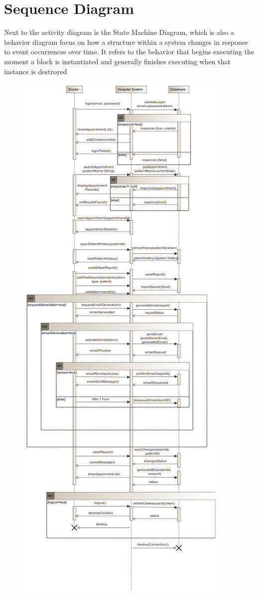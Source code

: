 \documentclass{article}
\begin{document}
            \section{Sequence Diagram}
            Next to the activity diagram is the State Machine Diagram, which is also a behavior
            diagram focus on how a structure within a system changes in response to event
            occurrences over time. It refers to the behavior that begins executing the moment a block
            is instantiated and generally finishes executing when that instance is destroyed
            \begin{figure}[H]
                \centering 
                \includegraphics[width=1\linewidth]{./img/seq.png}

\end{figure}
\end{document}
